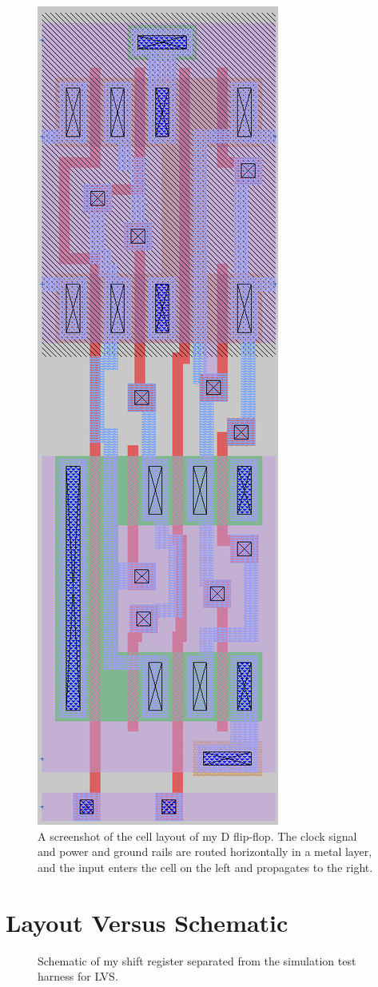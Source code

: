 \documentclass{article}
\begin{document}
\begin{figure}[!ht]
    \centering
    \includegraphics[width=.375\columnwidth]{../layout/flipflop.png}
    \caption{A screenshot of the cell layout of my D flip-flop. The clock signal and power and ground rails are routed horizontally in a metal layer, and the input enters the cell on the left and propagates to the right.}\label{fig:layout_flipflop}
\end{figure}

\clearpage

\section{Layout Versus Schematic}

\begin{figure}[h]
    \centering
    
    \caption{Schematic of my shift register separated from the simulation test harness for LVS.}\label{fig:lvs_schem}
\end{figure}
\end{document}
